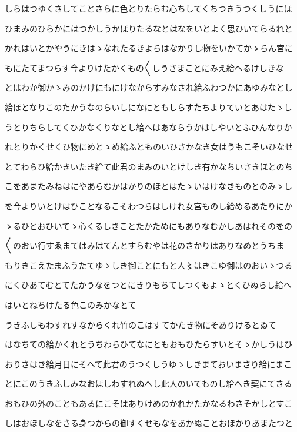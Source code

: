 \documentclass[a4paper,11pt,landscape]{ltjtarticle}
\begin{document}
しらはつゆくさしてことさらに色とりたらむ心ちしてくちつきうつくしうにほ
\par\medskip
ひまみのひらかにはつかしうかほりたるなとはなをいとよく思ひいてらるれと
\par\medskip
かれはいとかやうにきはゝなれたるきよらはなかりし物をいかてかゝらん宮に
\par\medskip
もにたてまつらす今よりけたかくもの〱しうさまことにみえ給へるけしきな
\par\medskip
とはわか御かゝみのかけにもにけなからすみなされ給ふわつかにあゆみなとし
\par\medskip
給ほとなりこのたかうなのらいしになにともしらすたちよりていとあはたゝし
\par\medskip
うとりちらしてくひかなくりなとし給へはあならうかはしやいとふひんなりか
\par\medskip
れとりかくせくひ物にめとゝめ給ふとものいひさかなき女はうもこそいひなせ
\par\medskip
とてわらひ給かきいたき給て此君のまみのいとけしき有かなちいさきほとのち
\par\medskip
こをあまたみねはにやあらむかはかりのほとはたゝいはけなきものとのみゝし
\par\medskip
を今よりいとけはひことなるこそわつらはしけれ女宮ものし給めるあたりにか
\par\medskip
ゝるひとおひいてゝ心くるしきことたかためにもありなむかしあはれそのをの
\par\medskip
〱のおい行すゑまてはみはてんとすらむやは花のさかりはありなめとうちま
\par\medskip
もりきこえたまふうたてゆゝしき御ことにもと人〻はきこゆ御はのおいゝつる
\par\medskip
にくひあてむとてたかうなをつとにきりもちてしつくもよゝとくひぬらし給へ
\par\medskip
はいとねちけたる色このみかなとて
\par\medskip
うきふしもわすれすなからくれ竹のこはすてかたき物にそありけるとゐて
\par\medskip
はなちての給かくれとうちわらひてなにともおもひたらすいとそゝかしうはひ
\par\medskip
おりさはき給月日にそへて此君のうつくしうゆゝしきまておいまさり給にまこ
\par\medskip
とにこのうきふしみなおほしわすれぬへし此人のいてものし給へき契にてさる
\par\medskip
おもひの外のこともあるにこそはありけめのかれかたかなるわさそかしとすこ
\par\medskip
しはおほしなをさる身つからの御すくせもなをあかぬことおほかりあまたつと
\end{document}
